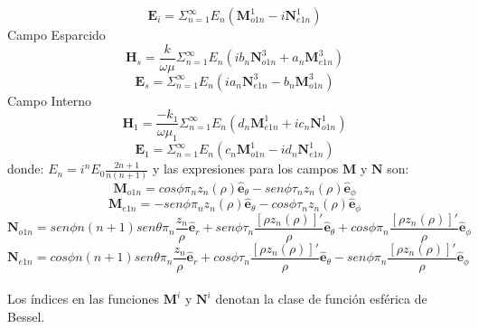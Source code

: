 \documentclass[11pt]{article}
\begin{document}
\begin{equation*}
\textbf{E}_{i}=\Sigma_{n=1}^{\infty} E_{n}(\textbf{M}_{o1n}^{1}-i\textbf{N}_{e1n}^{1})
\end{equation*}
Campo Esparcido
\begin{equation}
\textbf{H}_{s}=\frac{k}{\omega \mu} \Sigma_{n=1}^{\infty} E_{n}(ib_{n}\textbf{N}_{o1n}^{3}+a_{n}\textbf{M}_{e1n}^{3})
\end{equation}
\begin{equation*}
\textbf{E}_{s}=\Sigma_{n=1}^{\infty} E_{n}(ia_{n}\textbf{N}_{e1n}^{3}-b_{n}\textbf{M}_{o1n}^{3})
\end{equation*}
Campo Interno
\begin{equation}
\textbf{H}_{1}=\frac{-k_{1}}{\omega \mu_{1}} \Sigma_{n=1}^{\infty} E_{n}(d_{n}\textbf{M}_{e1n}^{1}+ic_{n}\textbf{N}_{o1n}^{1})
\end{equation}
\begin{equation*}
\textbf{E}_{1}=\Sigma_{n=1}^{\infty} E_{n}(c_{n}\textbf{M}_{o1n}^{1}-id_{n}\textbf{N}_{e1n}^{1})
\end{equation*}
donde: $E_{n}=i^{n}E_{0}\frac{2n+1}{n(n+1)}$
y las expresiones para los campos $\textbf{M}$ y $\textbf{N}$ son:
\begin{equation}
\textbf{M}_{o1n}=cos\phi \pi_{n}z_{n}(\rho)  \hat{\textbf{e}}_{\theta}-sen\phi \tau_{n}z_{n}(\rho)  \hat{\textbf{e}}_{\phi}
\end{equation}
\begin{equation*}
\textbf{M}_{e1n}=-sen\phi \pi_{n}z_{n}(\rho)  \hat{\textbf{e}}_{\theta}-cos\phi \tau_{n}z_{n}(\rho)  \hat{\textbf{e}}_{\phi}
\end{equation*}
\begin{equation*}
\textbf{N}_{o1n}=sen \phi n(n+1) sen\theta \pi_{n} \frac{z_n}{\rho} \hat{\textbf{e}}_{r}+sen\phi \tau_{n}\frac{[\rho z_{n}(\rho)]'}{\rho}\hat{\textbf{e}}_{\theta}+cos\phi \pi_{n}\frac{[\rho z_{n}(\rho)]'}{\rho}\hat{\textbf{e}}_{\phi}
\end{equation*}
\begin{equation*}
\textbf{N}_{e1n}=cos\phi n(n+1) sen\theta \pi_{n} \frac{z_n}{\rho} \hat{\textbf{e}}_{r}+cos\phi \tau_{n}\frac{[\rho z_{n}(\rho)]'}{\rho}\hat{\textbf{e}}_{\theta}-sen\phi \pi_{n}\frac{[\rho z_{n}(\rho)]'}{\rho}\hat{\textbf{e}}_{\phi}
\end{equation*}
\\
Los índices en las funciones $\textbf{M}^{i}$ y $\textbf{N}^{i}$ denotan la clase de función esférica de Bessel.
\\
\end{document}
